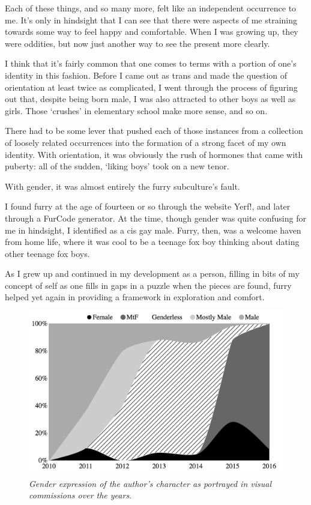 Each of these things, and so many more, felt like an independent occurrence to me.  It's only in hindsight that I can see that there were aspects of me straining towards some way to feel happy and comfortable.  When I was growing up, they were oddities, but now just another way to see the present more clearly.

I think that it's fairly common that one comes to terms with a portion of one's identity in this fashion.  Before I came out as trans and made the question of orientation at least twice as complicated, I went through the process of figuring out that, despite being born male, I was also attracted to other boys as well as girls.  Those `crushes' in elementary school make more sense, and so on.

There had to be some lever that pushed each of those instances from a collection of loosely related occurrences into the formation of a strong facet of my own identity.  With orientation, it was obviously the rush of hormones that came with puberty: all of the sudden, `liking boys' took on a new tenor.

With gender, it was almost entirely the furry subculture's fault.

I found furry at the age of fourteen or so through the website Yerf!, and later through a FurCode generator.  At the time, though gender was quite confusing for me in hindsight, I identified as a cis gay male.  Furry, then, was a welcome haven from home life, where it was cool to be a teenage fox boy thinking about dating other teenage fox boys.

As I grew up and continued in my development as a person, filling in bits of my concept of self as one fills in gaps in a puzzle when the pieces are found, furry helped yet again in providing a framework in exploration and comfort.

\begin{figure}
  \centering
  \includegraphics[scale=0.45]{assets/commissions-sex-preview.png}
  \caption{\textit{Gender expression of the author's character as portrayed in visual commissions over the years.}}
  \label{fig:commissions-sex}
\end{figure}

